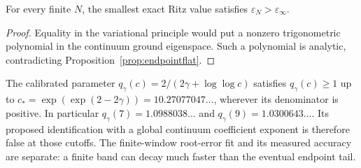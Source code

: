 \begin{corollary}
\label{cor:notermination}
For every finite $N$, the smallest exact Ritz value satisfies
$\varepsilon_N>\varepsilon_\infty$.
\end{corollary}
\begin{proof}
Equality in the variational principle would put a nonzero trigonometric
polynomial in the continuum ground eigenspace. Such a polynomial is
analytic, contradicting Proposition~\ref{prop:endpointflat}.
\end{proof}

The calibrated parameter $q_\gamma(c)=2/(2\gamma+\log\log c)$ satisfies
$q_\gamma(c)\ge1$ up to
$c_*=\exp(\exp(2-2\gamma))=10.27077047\ldots$, wherever its denominator
is positive. In particular $q_\gamma(7)=1.0988038\ldots$ and
$q_\gamma(9)=1.0300643\ldots$. Its proposed identification with a global
continuum coefficient exponent is therefore false at those cutoffs.
The finite-window root-error fit and its measured accuracy are separate:
a finite band can decay much faster than the eventual endpoint tail.

